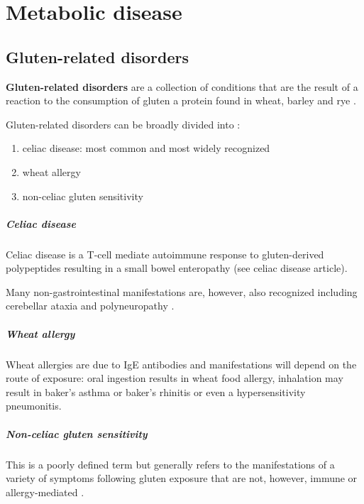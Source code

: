 \chapter{Metabolic disease}

\section{Gluten-related disorders}

\textbf{Gluten-related disorders} are a collection of conditions that are the result of a reaction to the consumption of gluten a protein found in wheat, barley and rye .

Gluten-related disorders can be broadly divided into :

\begin{enumerate}
	\tightlist
	\item
	celiac disease: most common and most widely recognized
	\item
	wheat allergy
	\item
	non-celiac gluten sensitivity
\end{enumerate}

\paragraph{Celiac disease}

Celiac disease is a T-cell mediate autoimmune response to gluten-derived polypeptides resulting in a small bowel enteropathy (see celiac disease article).

Many non-gastrointestinal manifestations are, however, also recognized including cerebellar ataxia and polyneuropathy .

\paragraph{Wheat allergy}

Wheat allergies are due to IgE antibodies and manifestations will depend on the route of exposure: oral ingestion results in wheat food allergy, inhalation may result in baker's asthma or baker's rhinitis or even a hypersensitivity pneumonitis.

\paragraph{Non-celiac gluten sensitivity}

This is a poorly defined term but generally refers to the manifestations of a variety of symptoms following gluten exposure that are not, however, immune or allergy-mediated .